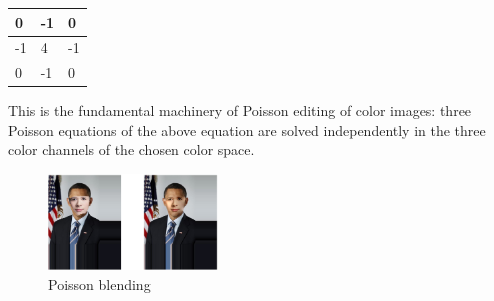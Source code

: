\documentclass[10pt,twocolumn,letterpaper]{article}
\begin{document}
\begin{table}[h]
\centering
\begin{tabular}{|l|l|l|}
\hline
 0 & -1 & 0 \\ \hline
 -1 & 4 & -1  \\ \hline
 0 & -1 & 0  \\ \hline
\end{tabular}
\end{table}

This is the fundamental machinery of Poisson editing of color images: three Poisson equations of the above equation are solved independently in the three color channels of the chosen color space.

\begin{figure}[hb]
  \centering
  \includegraphics[width=0.4\textwidth]{possion_blending_result.eps}
  \caption{Poisson blending}\label{blending}
\end{figure}


{\small


}
\end{document}
